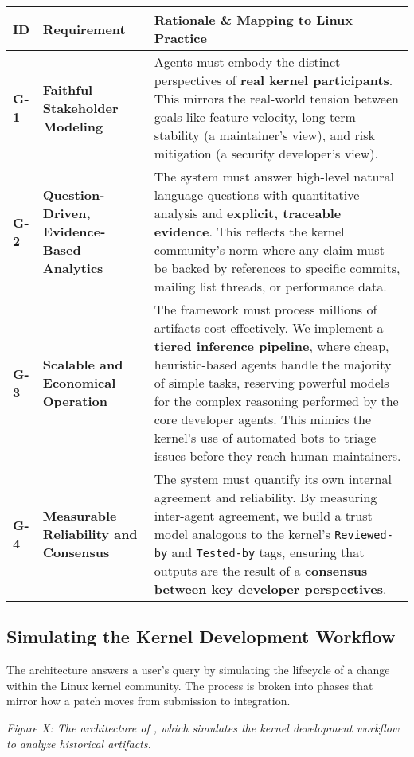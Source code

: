 \begin{table}[h]
\centering
\begin{tabular}{p{1cm}|p{4cm}|p{9cm}}
\hline
ID & Requirement & Rationale \& Mapping to Linux Practice \\
\hline
\textbf{G-1} & \textbf{Faithful Stakeholder Modeling} & Agents must embody the distinct perspectives of \textbf{real kernel participants}. This mirrors the real-world tension between goals like feature velocity, long-term stability (a maintainer's view), and risk mitigation (a security developer's view). \\
\textbf{G-2} & \textbf{Question-Driven, Evidence-Based Analytics} & The system must answer high-level natural language questions with quantitative analysis and \textbf{explicit, traceable evidence}. This reflects the kernel community's norm where any claim must be backed by references to specific commits, mailing list threads, or performance data. \\
\textbf{G-3} & \textbf{Scalable and Economical Operation} & The framework must process millions of artifacts cost-effectively. We implement a \textbf{tiered inference pipeline}, where cheap, heuristic-based agents handle the majority of simple tasks, reserving powerful models for the complex reasoning performed by the core developer agents. This mimics the kernel's use of automated bots to triage issues before they reach human maintainers. \\
\textbf{G-4} & \textbf{Measurable Reliability and Consensus} & The system must quantify its own internal agreement and reliability. By measuring inter-agent agreement, we build a trust model analogous to the kernel's \texttt{Reviewed-by} and \texttt{Tested-by} tags, ensuring that outputs are the result of a \textbf{consensus between key developer perspectives}. \\
\hline
\end{tabular}
\end{table}


\subsection{Simulating the Kernel Development Workflow}

The \sys architecture answers a user's query by simulating the lifecycle of a change within the Linux kernel community. The process is broken into phases that mirror how a patch moves from submission to integration.

\emph{Figure X: The architecture of \sys, which simulates the kernel development workflow to analyze historical artifacts.}

